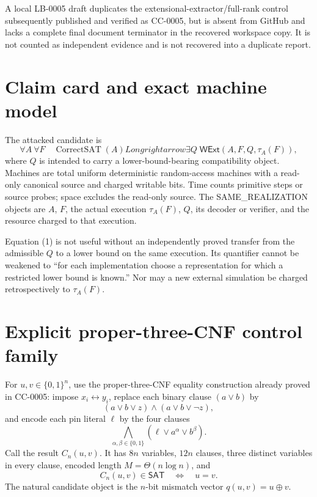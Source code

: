 \documentclass[11pt]{article}
\newcommand{\SAT}{\mathsf{SAT}}
\begin{document}
A local LB-0005 draft duplicates the extensional-extractor/full-rank control
subsequently published and verified as CC-0005, but is absent from GitHub and
lacks a complete final document terminator in the recovered workspace copy.
It is not counted as independent evidence and is not recovered into a
duplicate report.

\section{Claim card and exact machine model}
The attacked candidate is
\[
 \forall A\ \forall F\quad
 \operatorname{CorrectSAT}(A)Longrightarrow
 \exists Q\;\mathsf{WExt}(A,F,Q,\tau_A(F)),                 \tag{1}
\]
where $Q$ is intended to carry a lower-bound-bearing compatibility object.
Machines are total uniform deterministic random-access machines with a
read-only canonical source and charged writable bits.  Time counts primitive
steps or source probes; space excludes the read-only source.  The
SAME\_REALIZATION objects are $A$, $F$, the actual execution $\tau_A(F)$,
$Q$, its decoder or verifier, and the resource charged to that execution.

Equation (1) is not useful without an independently proved transfer from the
admissible $Q$ to a lower bound on the same execution.  Its quantifier cannot
be weakened to ``for each implementation choose a representation for which a
restricted lower bound is known.''  Nor may a new external simulation be
charged retrospectively to $\tau_A(F)$.

\section{Explicit proper-three-CNF control family}
For $u,v\in\{0,1\}^n$, use the proper-three-CNF equality construction already
proved in CC-0005: impose $x_i\leftrightarrow y_i$, replace each binary clause
$(a\lor b)$ by
\[
 (a\lor b\lor z)\wedge(a\lor b\lor\neg z),
\]
and encode each pin literal $\ell$ by the four clauses
\[
 \bigwedge_{\alpha,\beta\in\{0,1\}}
 (\ell\lor a^\alpha\lor b^\beta).
\]
Call the result $C_n(u,v)$.  It has $8n$ variables, $12n$ clauses, three
distinct variables in every clause, encoded length $M=\Theta(n\log n)$, and
\[
 C_n(u,v)\in\SAT\quad\Longleftrightarrow\quad u=v.
\]
The natural candidate object is the $n$-bit mismatch vector
$q(u,v)=u\oplus v$.
\end{document}

